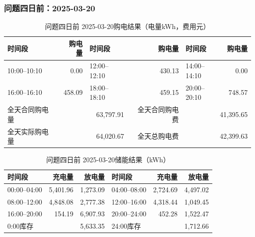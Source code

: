 \par\noindent\begin{minipage}{\textwidth}
\subsubsection*{问题四日前：2025-03-20}
\begin{table}[H]\centering\small\setlength{\tabcolsep}{4pt}\caption{问题四日前 2025-03-20购电结果（电量kWh，费用元）}
\begin{tabular}{lr lr lr}\toprule
时间段 & 购电量 & 时间段 & 购电量 & 时间段 & 购电量\\\midrule
10:00--10:10 & 0.00 & 12:00--12:10 & 430.13 & 14:00--14:10 & 0.00\\
16:00--16:10 & 458.09 & 18:00--18:10 & 459.15 & 20:00--20:10 & 748.57\\
\midrule
全天合同购电量 & \multicolumn{2}{r}{63,797.91} & 全天合同购电费 & \multicolumn{2}{r}{41,395.65}\\
全天实际购电量 & \multicolumn{2}{r}{64,020.67} & 全天总购电费 & \multicolumn{2}{r}{42,399.63}\\
\bottomrule\end{tabular}\end{table}
\begin{table}[H]\centering\small\setlength{\tabcolsep}{4pt}\caption{问题四日前 2025-03-20储能结果（kWh）}
\begin{tabular}{lrr lrr}\toprule
时间段 & 充电量 & 放电量 & 时间段 & 充电量 & 放电量\\\midrule
00:00--04:00 & 5,401.96 & 1,273.09 & 04:00--08:00 & 2,724.69 & 4,497.02\\
08:00--12:00 & 4,848.08 & 2,777.38 & 12:00--16:00 & 4,318.44 & 1,049.45\\
16:00--20:00 & 154.19 & 6,907.93 & 20:00--24:00 & 452.28 & 1,522.47\\
\midrule
0:00库存 & \multicolumn{2}{r}{5,633.35} & 24:00库存 & \multicolumn{2}{r}{1,712.66}\\
\bottomrule\end{tabular}\end{table}
\end{minipage}\par

